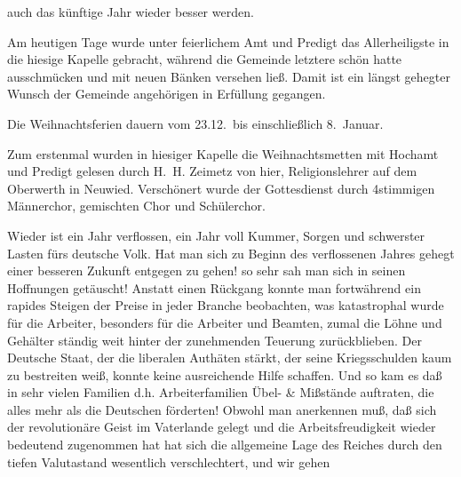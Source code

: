 

auch das künftige Jahr wieder besser werden.

%
Am heutigen Tage wurde unter feierlichem Amt\ob
und Predigt das Allerheiligste in die hiesige Kapelle\ob
gebracht, während die Gemeinde letztere schön hatte\ob
ausschmücken und mit neuen Bänken versehen ließ.\ob
Damit ist ein längst gehegter Wunsch der Gemeinde\ohb
angehörigen in Erfüllung gegangen.

%
Die Weihnachtsferien dauern vom 23.12.\ bis\ob
einschließlich 8.\ Januar.

%
Zum erstenmal wurden in hiesiger Kapelle die\ob
Weihnachtsmetten mit Hochamt und Predigt gelesen\ob
durch H.\ H. Zeimetz von hier, Religionslehrer auf\ob
dem Oberwerth in Neuwied. Verschönert wurde der\ob
Gottesdienst durch 4stimmigen Männerchor, gemischten\ob
Chor und Schülerchor.

\pend
{}
\pstart

%
Wieder ist ein Jahr verflossen, ein Jahr voll\ob
Kummer, Sorgen und schwerster Lasten fürs deutsche\ob
Volk. Hat man sich zu Beginn des verflossenen\ob
Jahres gehegt einer besseren Zukunft entgegen zu\ob
gehen! so sehr sah man sich in seinen Hoffnungen\ob
getäuscht! Anstatt einen Rückgang konnte man\ob
fortwährend ein rapides Steigen der Preise in\ob
jeder Branche beobachten, was katastrophal wurde\ob
für die Arbeiter, besonders für die Arbeiter und\ob
Beamten, zumal die Löhne und Gehälter ständig\ob
weit hinter der zunehmenden Teuerung zurückblieben.\ob
Der Deutsche Staat, der die liberalen Authäten stärkt,\ob
der seine Kriegsschulden kaum zu bestreiten weiß,\ob
konnte keine ausreichende Hilfe schaffen. Und so kam\ob
es daß in sehr vielen Familien d.h. Arbeiterfamilien\ob
Übel- \& Mißstände auftraten, die alles mehr als\ob
die Deutschen förderten! Obwohl man anerkennen muß,\ob
daß sich der revolutionäre Geist im Vaterlande gelegt\ob
und die Arbeitsfreudigkeit wieder bedeutend zugenommen\ob
hat hat sich die allgemeine Lage des Reiches durch den\ob
tiefen Valutastand wesentlich verschlechtert, und wir gehen
\pend
